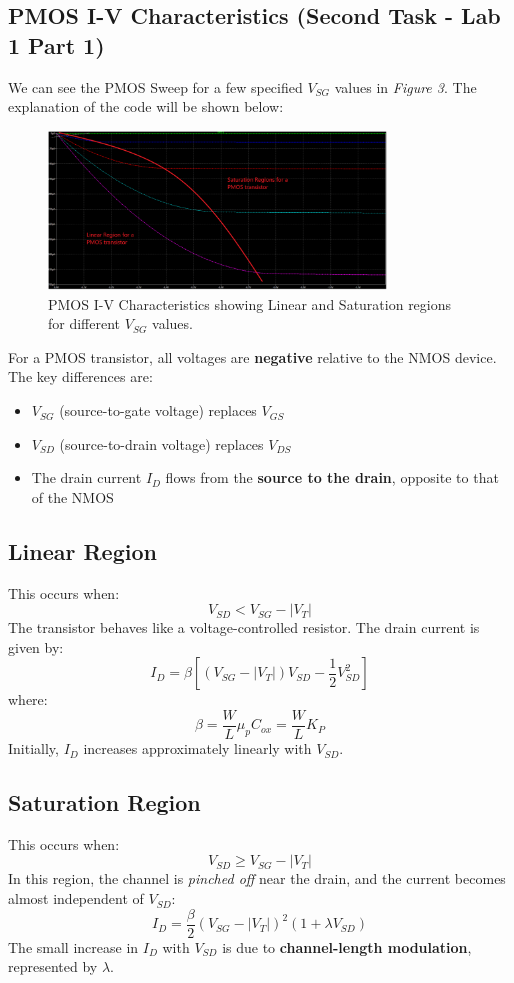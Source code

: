 \documentclass[a4paper,12pt]{article}
\begin{document}
\subsection{PMOS I-V Characteristics (Second Task - Lab 1 Part 1)}

We can see the PMOS Sweep for a few specified $V_{SG}$ values in \textit{Figure 3}. The explanation of the code will be shown below:

\begin{figure}
    \centering
    \includegraphics[width=0.8\textwidth]{PMOSSweep.png}
    \caption{PMOS I-V Characteristics showing Linear and Saturation regions for different $V_{SG}$ values.}
    \label{fig:pmos_sweep}
\end{figure}

For a PMOS transistor, all voltages are \textbf{negative} relative to the NMOS device. The key differences are:

\begin{itemize}
    \item $V_{SG}$ (source-to-gate voltage) replaces $V_{GS}$
    \item $V_{SD}$ (source-to-drain voltage) replaces $V_{DS}$
    \item The drain current $I_D$ flows from the \textbf{source to the drain}, opposite to that of the NMOS
\end{itemize}

\subsection*{Linear Region}
This occurs when:
\[
V_{SD} < V_{SG} - |V_T|
\]
The transistor behaves like a voltage-controlled resistor. The drain current is given by:
\[
I_D = \beta \left[ (V_{SG} - |V_T|)V_{SD} - \frac{1}{2}V_{SD}^2 \right]
\]
where:
\[
\beta = \frac{W}{L}\mu_p C_{ox} = \frac{W}{L} K_P
\]
Initially, $I_D$ increases approximately linearly with $V_{SD}$.

\subsection*{Saturation Region}
This occurs when:
\[
V_{SD} \geq V_{SG} - |V_T|
\]
In this region, the channel is \emph{pinched off} near the drain, and the current becomes almost independent of $V_{SD}$:
\[
I_D = \frac{\beta}{2}(V_{SG} - |V_T|)^2(1 + \lambda V_{SD})
\]
The small increase in $I_D$ with $V_{SD}$ is due to \textbf{channel-length modulation}, represented by $\lambda$.
\end{document}
